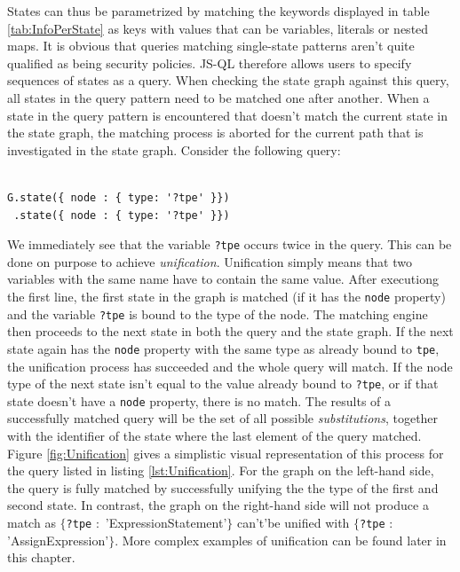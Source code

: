 \noindent States can thus be parametrized by matching the keywords displayed in table \ref{tab:InfoPerState} as keys with values that can be variables, literals or nested maps. It is obvious that queries matching single-state patterns aren't quite qualified as being security policies. JS-QL therefore allows users to specify sequences of states as a query. When checking the state graph against this query, all states in the query pattern need to be matched one after another. When a state in the query pattern is encountered that doesn't match the current state in the state graph, the matching process is aborted for the current path that is investigated in the state graph. Consider the following query:

\begin{lstlisting}[label={lst:Unification},language=JSQL,caption=Unification in JS-QL,mathescape=true]  % float=t?

G.state({ node : { type: '?tpe' }})
 .state({ node : { type: '?tpe' }})
\end{lstlisting}

\noindent We immediately see that the variable \texttt{?tpe} occurs twice in the query. This can be done on purpose to achieve \textit{unification}. Unification simply means that two variables with the same name have to contain the same value. After executiong the first line, the first state in the graph is matched (if it has the \texttt{node} property) and the variable \texttt{?tpe} is bound to the type of the node. The matching engine then proceeds to the next state in both the query and the state graph. If the next state again has the \texttt{node} property with the same type as already bound to \texttt{tpe}, the unification process has succeeded and the whole query will match. If the node type of the next state isn't equal to the value already bound to \texttt{?tpe}, or if that state doesn't have a \texttt{node} property, there is no match. The results of a successfully matched query will be the set of all possible \textit{substitutions}, together with the identifier of the state where the last element of the query matched. Figure \ref{fig:Unification} gives a simplistic visual representation of this process for the query listed in listing \ref{lst:Unification}. For the graph on the left-hand side, the query is fully matched by successfully unifying the the type of the first and second state. In contrast, the graph on the right-hand side will not produce a match as $\{$\texttt{?tpe} $:$ 'ExpressionStatement'$\}$ can't'be unified with $\{$\texttt{?tpe} $:$ 'AssignExpression'$\}$. More complex examples of unification can be found later in this chapter.

